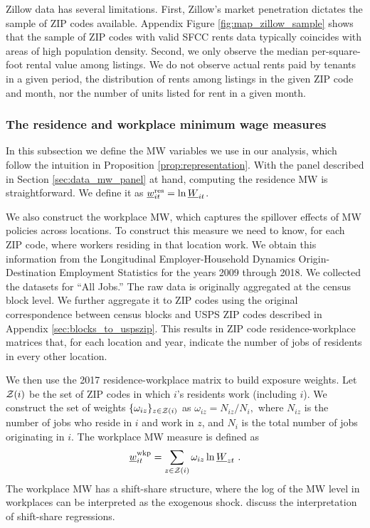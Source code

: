 Zillow data has several limitations.
First, Zillow's market penetration dictates the sample of ZIP codes available.
Appendix Figure \ref{fig:map_zillow_sample} shows that the sample of ZIP codes
with valid SFCC rents data typically coincides with areas of high population 
density.
Second, we only observe the median per-square-foot rental value among listings.
We do not observe actual rents paid by tenants in a given period, 
the distribution of rents among listings in the given ZIP code and month, nor
the number of units listed for rent in a given month.

\subsubsection{The residence and workplace minimum wage measures}
\label{sec:data_mw_measures}

In this subsection we define the MW variables we use in our analysis,
which follow the intuition in Proposition \ref{prop:representation}.
With the panel described in Section \ref{sec:data_mw_panel} at hand, computing 
the residence MW is straightforward.
We define it as $\underline{w}^{\text{res}}_{it} = \ln \underline{W}_{it}$.

We also construct the workplace MW, which captures the spillover effects of
MW policies across locations.
To construct this measure we need to know, for each ZIP code, where workers 
residing in that location work.
We obtain this information from the Longitudinal Employer-Household 
Dynamics Origin-Destination Employment Statistics \parencite[LODES;][]{CensusLODES}
for the years 2009 through 2018.
We collected the datasets for ``All Jobs.''
The raw data is originally aggregated at the census block level. 
We further aggregate it to ZIP codes using the original correspondence between 
census blocks and USPS ZIP codes described in Appendix 
\ref{sec:blocks_to_uspszip}.
This results in ZIP code residence-workplace matrices that, for each location 
and year, indicate the number of jobs of residents in every other location.

We then use the 2017 residence-workplace matrix to build exposure 
weights.
Let $\mathcal{Z}(i)$ be the set of ZIP codes in which $i$'s residents work 
(including $i$).
We construct the set of weights $\{\omega_{iz}\}_{z\in\mathcal{Z}(i)}$ as 
$ \omega_{iz} = N_{iz}/{N_i} , $
where 
$N_{iz}$ is the number of jobs who reside in $i$ and work in $z$, 
and $N_i$ is the total number of jobs originating in $i$.
The workplace MW measure is defined as
\begin{equation*}\label{eq:mw_wkp_definition}
    \mw^{\wkp}_{it} = \sum_{z\in\Z(i)} \omega_{iz} \ln \MW_{zt} \ .
\end{equation*}
The workplace MW has a shift-share structure, where the log of the MW level
in workplaces can be interpreted as the exogenous shock.
\textcite{BorusyakHullJaravel2021} discuss the interpretation of shift-share
regressions.


